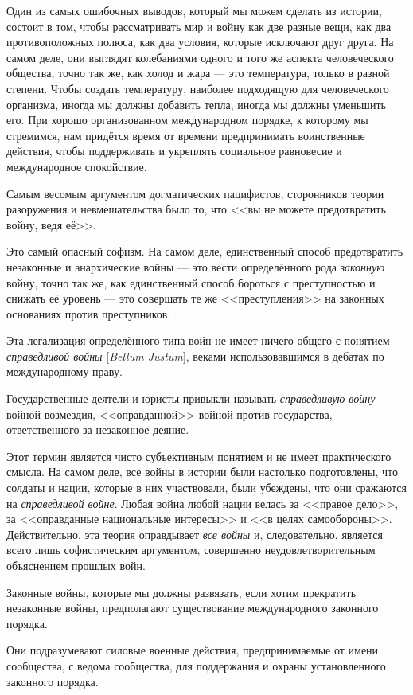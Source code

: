 Один из самых ошибочных выводов, который мы можем сделать из истории, состоит в том, чтобы рассматривать мир и войну как две разные вещи, как два противоположных полюса, как два условия, которые исключают друг друга. На самом деле, они выглядят колебаниями одного и того же аспекта человеческого общества, точно так же, как холод и жара — это температура, только в разной степени. Чтобы создать температуру, наиболее подходящую для человеческого организма, иногда мы должны добавить тепла, иногда мы должны уменьшить его. При хорошо организованном международном порядке, к которому мы стремимся, нам придётся время от времени предпринимать воинственные действия, чтобы поддерживать и укреплять социальное равновесие и международное спокойствие.
 
Самым весомым аргументом догматических пацифистов, сторонников теории разоружения и невмешательства было то, что <<вы не можете предотвратить войну, ведя её>>.
 
Это самый опасный софизм. На самом деле, единственный способ предотвратить незаконные и анархические войны — это вести определённого рода \textit{законную} войну, точно так же, как единственный способ бороться с преступностью и снижать её уровень — это совершать те же <<преступления>> на законных основаниях против преступников.
 
Эта легализация определённого типа войн не имеет ничего общего с понятием \textit{справедливой войны} [\textit{Bellum Justum}], веками использовавшимся в дебатах по международному праву.
 
Государственные деятели и юристы привыкли называть \textit{справедливую войну} войной возмездия, <<оправданной>> войной против государства, ответственного за незаконное деяние.
 
Этот термин является чисто субъективным понятием и не имеет практического смысла. На самом деле, все войны в истории были настолько подготовлены, что солдаты и нации, которые в них участвовали, были убеждены, что они сражаются на \textit{справедливой войне}. Любая война любой нации велась за <<правое дело>>, за <<оправданные национальные интересы>> и <<в целях самообороны>>. Действительно, эта теория оправдывает \textit{все войны} и, следовательно, является всего лишь софистическим аргументом, совершенно неудовлетворительным объяснением прошлых войн.
 
Законные войны, которые мы должны развязать, если хотим прекратить незаконные войны, предполагают существование международного законного порядка.
 
Они подразумевают силовые военные действия, предпринимаемые от имени сообщества, с ведома сообщества, для поддержания и охраны установленного законного порядка.
